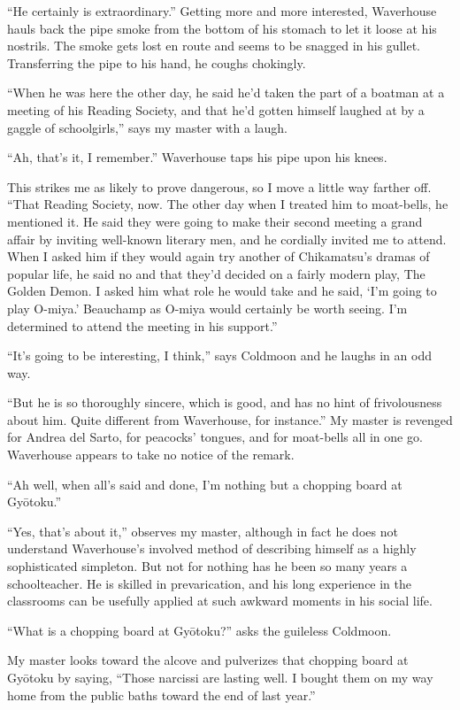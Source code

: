 \documentclass[12pt, openright]{book}
\begin{document}
``He certainly is extraordinary.'' Getting more and more interested,
Waverhouse hauls back the pipe smoke from the bottom of his stomach to
let it loose at his nostrils. The smoke gets lost en route and seems to
be snagged in his gullet. Transferring the pipe to his hand, he coughs
chokingly.

``When he was here the other day, he said he'd taken the part of a
boatman at a meeting of his Reading Society, and that he'd gotten
himself laughed at by a gaggle of schoolgirls,'' says my master with a
laugh.

``Ah, that's it, I remember.'' Waverhouse taps his pipe upon his knees.

This strikes me as likely to prove dangerous, so I move a little way
farther off. ``That Reading Society, now. The other day when I treated
him to moat-bells, he mentioned it. He said they were going to make
their second meeting a grand affair by inviting well-known literary men,
and he cordially invited me to attend. When I asked him if they would
again try another of Chikamatsu's dramas of popular life, he said no and
that they'd decided on a fairly modern play, The Golden Demon. I asked
him what role he would take and he said, `I'm going to play O-miya.'
Beauchamp as O-miya would certainly be worth seeing. I'm determined to
attend the meeting in his support.''

``It's going to be interesting, I think,'' says Coldmoon and he laughs
in an odd way.

``But he is so thoroughly sincere, which is good, and has no hint of
frivolousness about him. Quite different from Waverhouse, for
instance.'' My master is revenged for Andrea del Sarto, for peacocks'
tongues, and for moat-bells all in one go. Waverhouse appears to take no
notice of the remark.

``Ah well, when all's said and done, I'm nothing but a chopping board at
Gyōtoku.''

``Yes, that's about it,'' observes my master, although in fact he does
not understand Waverhouse's involved method of describing himself as a
highly sophisticated simpleton. But not for nothing has he been so many
years a schoolteacher. He is skilled in prevarication, and his long
experience in the classrooms can be usefully applied at such awkward
moments in his social life.

``What is a chopping board at Gyōtoku?'' asks the guileless Coldmoon.

My master looks toward the alcove and pulverizes that chopping board at
Gyōtoku by saying, ``Those narcissi are lasting well. I bought them on
my way home from the public baths toward the end of last year.''
\end{document}
